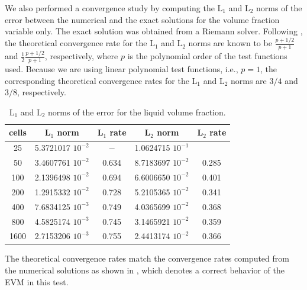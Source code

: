 \documentclass[preprint,10pt]{elsarticle}
\begin{document}
We also performed a convergence study by computing the L$_1$ and L$_2$ norms of the error between the numerical and the exact solutions for the volume 
fraction variable only. The exact solution was obtained from a Riemann solver. Following \cite{convergence_book}, the theoretical convergence rate for the L$_1$ and
L$_2$ norms are known to be $\frac{p+1/2}{p+1}$ and $\frac{1}{2}\frac{p+1/2}{p+1}$, respectively, where $p$ is the polynomial order of the test functions used. 
Because we are using linear polynomial test functions, i.e., $p=1$, the corresponding theoretical convergence rates for the L$_1$ and L$_2$ norms are 
$3/4$ and $3/8$, respectively. 
%
\begin{table}[H]
\begin{center}
 \caption{\label{tbl:conv_rate_norm} L$_1$ and L$_2$ norms of the error for the liquid volume fraction.}
 \begin{tabular}{|c|c|c|c|c|}
 \hline
cells  & L$_1$ norm  & L$_1$ rate   & L$_2$ norm & L$_2$ rate  \\ \hline
25     & 5.3721017 $10^{-2}$ & $-$    & 1.0624715 $10^{-1}$ & \\ \hline
50     & 3.4607761 $10^{-2}$ & 0.634 & 8.7183697 $10^{-2}$  & 0.285 \\ \hline
100   & 2.1396498 $10^{-2}$ & 0.694 & 6.6006650 $10^{-2}$  & 0.401 \\ \hline
200   & 1.2915332 $10^{-2}$ & 0.728 & 5.2105365 $10^{-2}$  & 0.341 \\ \hline
400   & 7.6834125 $10^{-3}$ & 0.749 & 4.0365699 $10^{-2}$  & 0.368 \\ \hline
800   & 4.5825174 $10^{-3}$ & 0.745 & 3.1465921 $10^{-2}$  & 0.359 \\ \hline
1600 & 2.7153206 $10^{-3}$ & 0.755 & 2.4413174 $10^{-2}$ & 0.366 \\ \hline
\end{tabular}
\end{center}
\end{table}
%
The theoretical convergence rates match the convergence rates computed from the numerical solutions as shown in , which denotes a  
correct behavior of the EVM in this test.

%
\end{document}
